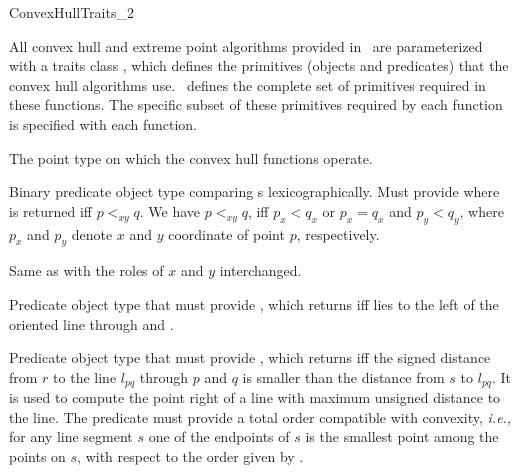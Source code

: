 

\begin{ccRefConcept}{ConvexHullTraits_2}

\ccDefinition
  
All convex hull and extreme point algorithms provided in \cgal\ are
parameterized with a traits class , which defines the
primitives (objects and predicates) that the convex hull algorithms use.
\ccRefName\ defines the complete set of primitives required in these
functions.  The specific subset of these primitives required by each function
is specified with each function.

\ccTypes
\ccAutoIndexingOff
{}

%
       {The point type on which the convex hull functions operate.}

%
       {Binary predicate object type comparing s
        lexicographically.  Must provide 
         where 
        is returned iff $p <_{xy} q$.
        We have $p<_{xy}q$, iff $p_x < q_x$ or $p_x = q_x$ and $p_y < q_y$,
        where $p_x$ and $p_y$ denote $x$ and $y$ coordinate of point $p$,
        respectively.
       }

%
       {Same as  with the roles of $x$ and $y$ interchanged.}

%
       {Predicate object type that must provide
        , which
        returns  iff  lies to the left of the
        oriented line through  and .}

%
       {Predicate object type that must provide 
        , which returns  iff
        the signed distance from $r$ to the line $l_{pq}$ through $p$ and $q$
        is smaller than the distance from $s$ to $l_{pq}$. It is used to
        compute the point right of a line with maximum unsigned distance to
        the line. The predicate must provide a total order compatible
        with convexity, {\it i.e.}, for any line segment $s$ one of the 
        endpoints 
        of $s$ is the smallest point among the points on $s$, with respect to
        the order given by .}


\end{ccRefConcept}
